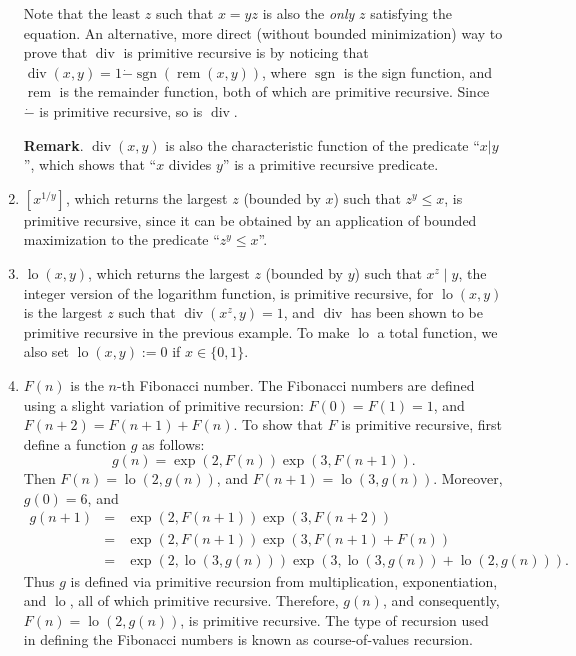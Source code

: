 \documentclass[12pt]{article}
\begin{document}
\begin{enumerate}
Note that the least $z$ such that $x=yz$ is also the \emph{only} $z$ satisfying the equation.  An alternative, more direct (without bounded minimization) way to prove that $\operatorname{div}$ is primitive recursive is by noticing that $\operatorname{div}(x,y)=1\dot{-}\operatorname{sgn}(\operatorname{rem}(x,y))$, where $\operatorname{sgn}$ is the sign function, and $\operatorname{rem}$ is the remainder function, both of which are primitive recursive.  Since $\dot{-}$ is primitive recursive, so is $\operatorname{div}$.

\textbf{Remark}.  $\operatorname{div}(x,y)$ is also the characteristic function of the predicate ``$x|y$'', which shows that ``$x$ divides $y$'' is a primitive recursive predicate.
\item $[x^{1/y}]$, which returns the largest $z$ (bounded by $x$) such that $z^y\le x$, is primitive recursive, since it can be obtained by an application of bounded maximization to the predicate ``$z^y\le x$''.
\item $\operatorname{lo}(x,y)$, which returns the largest $z$ (bounded by $y$) such that $x^z\mid y$, the integer version of the logarithm function, is primitive recursive, for $\operatorname{lo}(x,y)$ is the largest $z$ such that $\operatorname{div}(x^z, y)=1$, and $\operatorname{div}$ has been shown to be primitive recursive in the previous example.  To make $\operatorname{lo}$ a total function, we also set $\operatorname{lo}(x,y):=0$ if $x \in \lbrace 0,1\rbrace$.
\item $F(n)$ is the $n$-th Fibonacci number.  The Fibonacci numbers are defined using a slight variation of primitive recursion: $F(0)=F(1)=1$, and $F(n+2)=F(n+1)+F(n)$.  To show that $F$ is primitive recursive, first define a function $g$ as follows: $$g(n)=\operatorname{exp}(2,F(n))\operatorname{exp}(3,F(n+1)).$$  Then $F(n)=\operatorname{lo}(2,g(n))$, and $F(n+1)=\operatorname{lo}(3,g(n))$.  Moreover, $g(0)=6$, and 
\begin{eqnarray*}
g(n+1) &=& \operatorname{exp}(2,F(n+1))\operatorname{exp}(3,F(n+2)) \\ &=& \operatorname{exp}(2,F(n+1)) \operatorname{exp}(3,F(n+1)+F(n)) \\ &=& \operatorname{exp}(2,\operatorname{lo}(3,g(n))) \operatorname{exp}(3, \operatorname{lo}(3,g(n))+\operatorname{lo}(2,g(n))).
\end{eqnarray*}
Thus $g$ is defined via primitive recursion from multiplication, exponentiation, and $\operatorname{lo}$, all of which  primitive recursive.  Therefore, $g(n)$, and consequently, $F(n)=\operatorname{lo}(2,g(n))$, is primitive recursive.  The type of recursion used in defining the Fibonacci numbers is known as course-of-values recursion.

\end{enumerate}
\end{document}
